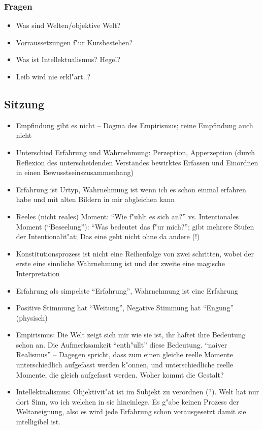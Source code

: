 \documentclass[emulatestandardclasses]{scrartcl}
\begin{document}
\subsubsection{Fragen}

\begin{itemize}
  \item Was sind Welten/objektive Welt?
  \item Vorraussetzungen f"ur Kursbestehen?
  \item Was ist Intellektualismus? Hegel?
  \item Leib wird nie erkl"art..?
\end{itemize}

\subsection{Sitzung}

\begin{itemize}
  \item Empfindung gibt es nicht -- Dogma des Empirismus; reine Empfindung auch nicht
  \item Unterschied Erfahrung und Wahrnehmung: Perzeption, Apperzeption (durch Reflexion des unterscheidenden Verstandes bewirktes Erfassen und Einordnen in einen Bewusstseinszusammenhang)
  \item Erfahrung ist Urtyp, Wahrnehmung ist wenn ich es schon einmal erfahren habe und mit alten Bildern in mir abgleichen kann
  \item Reeles (nicht reales) Moment: "`Wie f"uhlt es sich an?"' vs. Intentionales Moment ("`Beseelung"'): "`Was bedeutet das f"ur mich?"'; gibt mehrere Stufen der Intentionalit"at; Das eine geht nicht ohne da andere (!)
  \item Konstitutionsprozess ist nicht eine Reihenfolge von zwei schritten, wobei der erste eine sinnliche Wahrnehmung ist und der zweite eine magische Interpretation 
  \item Erfahrung als simpelste "`Erfahrung"', Wahrnehmung ist eine Erfahrung
  \item Positive Stimmung hat "`Weitung"', Negative Stimmung hat "`Engung"' (physisch)
  \item Empirismus: Die Welt zeigt sich mir wie sie ist, ihr haftet ihre Bedeutung schon an. Die Aufmerksamkeit "`enth"ullt"' diese Bedeutung. "`naiver Realismus"' -- Dagegen spricht, dass zum einen gleiche reelle Momente unterschiedlich aufgefasst werden k"onnen, und unterschiedliche reelle Momente, die gleich aufgefasst werden. Woher kommt die Gestalt?
  \item Intellektualismus: Objektivit"at ist im Subjekt zu verordnen (?). Welt hat nur dort Sinn, wo ich welchen in sie hineinlege. Es g"abe keinen Prozess der Weltaneignung, also es wird jede Erfahrung schon vorausgesetzt damit sie intelligibel ist.
\end{itemize}
\end{document}
